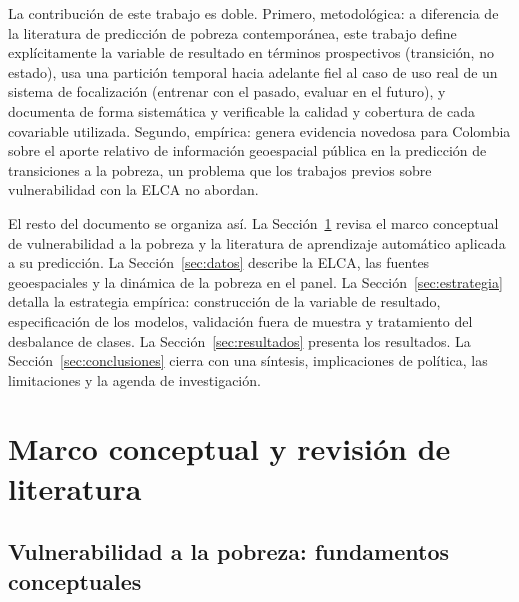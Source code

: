 \documentclass[12pt, letterpaper]{article}
\begin{document}
La contribución de este trabajo es doble. Primero, metodológica: a
diferencia de la literatura de predicción de pobreza contemporánea, este
trabajo define explícitamente la variable de resultado en términos
prospectivos (transición, no estado), usa una partición temporal hacia
adelante fiel al caso de uso real de un sistema de focalización (entrenar
con el pasado, evaluar en el futuro), y documenta de forma sistemática y
verificable la calidad y cobertura de cada covariable
utilizada. Segundo, empírica: genera evidencia novedosa para Colombia
sobre el aporte relativo de información geoespacial pública en la 
predicción de transiciones a la pobreza, un problema que los trabajos
previos sobre vulnerabilidad con la ELCA \parencite{hernandez2022} no
abordan.

El resto del documento se organiza así. La Sección~\ref{sec:literatura}
revisa el marco conceptual de vulnerabilidad a la pobreza y la literatura
de aprendizaje automático aplicada a su predicción. La
Sección~\ref{sec:datos} describe la ELCA, las fuentes geoespaciales y la
dinámica de la pobreza en el panel. La
Sección~\ref{sec:estrategia} detalla la estrategia empírica: construcción
de la variable de resultado, especificación de los modelos, validación fuera de muestra y
tratamiento del desbalance de clases. La Sección~\ref{sec:resultados}
presenta los resultados. La
Sección~\ref{sec:conclusiones} cierra con una síntesis, implicaciones de
política, las limitaciones y la agenda de investigación.

\section{Marco conceptual y revisión de literatura}
\label{sec:literatura}

\subsection{Vulnerabilidad a la pobreza: fundamentos conceptuales}
\label{subsec:vulnerabilidad}
\end{document}
